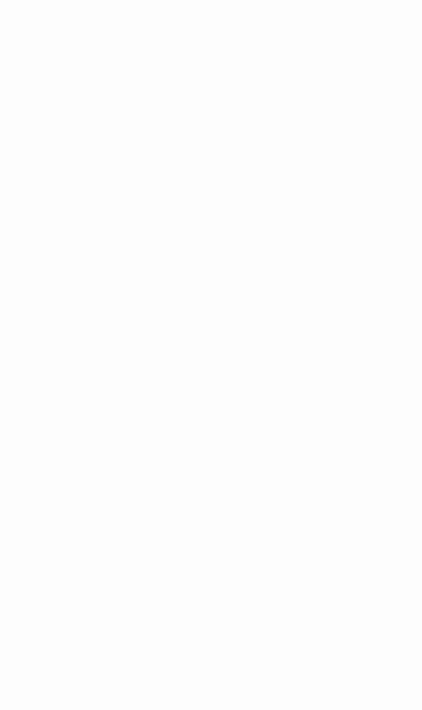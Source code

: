 \documentclass[a4paper,10pt]{article}
\begin{document}
\textcolor{white}{%
quality control digitalization QC system development Laravel full stack developer MySQL SQL Server database management REST API integration IoT systems Arduino sensor integration automated inspection machine learning AI image processing real-time monitoring production dashboard Power BI data analytics defect analysis root cause analysis RCA quality KPI statistical process control SPC 7 QC tools Fishbone diagram Pareto analysis manufacturing digitalization shop floor automation MES integration SCADA data flow management system architecture database design query optimization PHP backend development frontend development web application UX UI design user acceptance testing UAT cross functional collaboration production engineering quality assurance QA quality engineer technical documentation API documentation system integration ERP integration middleware development Node.js real-time data JSON XML data transformation ETL data cleaning data modeling business intelligence BI reporting automation dashboard development KPI monitoring performance metrics operational excellence continuous improvement kaizen lean manufacturing six sigma problem solving troubleshooting electrical systems automotive engineering mechatronics CAN bus protocol validation testing embedded systems microcontroller programming PLC SCADA HMI industrial automation factory digitalization Industry 4.0 smart manufacturing digital twin warehouse management WMS inventory control traceability data-driven decision making agile methodology project management stakeholder management process improvement workflow automation system deployment production support aftersales support maintenance documentation training material development operator training quality training ISO standards compliance regulatory certification government certification Ministry approval product development prototyping concept to production mass production readiness cost reduction BOM optimization supplier qualification local content procurement engineering change management ECN revision control version control git GitHub technical support help desk incident management SLA service level agreement escalation management customer satisfaction preventive maintenance predictive maintenance reliability engineering failure analysis FMEA DFMEA warranty analysis claim reduction field problem solving remote diagnostics system monitoring alert management notification system email integration SMS integration mobile application responsive design cross platform compatibility browser compatibility security implementation access control authentication authorization user management role based access RBAC data security encryption backup recovery disaster recovery business continuity performance optimization load testing stress testing integration testing unit testing debugging error handling exception management logging monitoring APM application performance monitoring cloud deployment on premise deployment hybrid deployment DevOps CI CD continuous integration continuous deployment pipeline automation build automation test automation deployment automation infrastructure management server management database administration DBA backup strategy migration strategy data }
\end{document}
